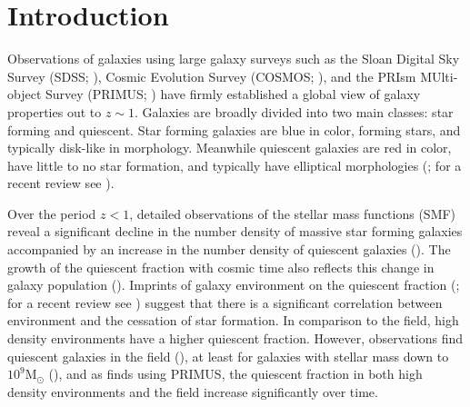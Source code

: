 \documentclass[iop,apj,tighten,twocolappendix,numberedappendix]{emulateapj}
\begin{document}
\section{Introduction}
Observations of galaxies using large galaxy surveys such as the 
Sloan Digital Sky Survey (SDSS; \citealt{York:2000aa}), 
Cosmic Evolution Survey (COSMOS; \citealt{Scoville:2007aa}), 
and the PRIsm MUlti-object Survey (PRIMUS;  \citealt{Coil:2011aa, Cool:2013aa}) 
have firmly established a global view of galaxy properties out to $z \sim 1$. 
Galaxies are broadly divided into two main classes: star forming and quiescent. 
Star forming galaxies are blue in color, forming stars, and typically 
disk-like in morphology. Meanwhile quiescent galaxies are red in color, 
have little to no star formation, and typically have elliptical morphologies 
(\citealt{Kauffmann:2003aa, Blanton:2003aa, Baldry:2006aa, 
Wyder:2007aa, Moustakas:2013aa}; for a recent review see \citealt{Blanton:2009aa}). 


Over the period $z < 1$, detailed observations of the stellar 
mass functions (SMF) reveal a significant decline in the number density 
of massive star forming galaxies accompanied by an increase in the 
number density of quiescent galaxies 
(\citealt{Blanton:2006aa, Borch:2006aa, Bundy:2006aa, Moustakas:2013aa}). 
The growth of the quiescent fraction with cosmic time also reflects 
this change in galaxy population 
(\citealt{Peng:2010aa, Tinker:2013aa, Hahn:2015aa}). 
Imprints of galaxy environment on the quiescent fraction 
(\citealt{Hubble:1936aa, Oemler:1974aa, Dressler:1980aa, Hermit:1996aa}; 
for a recent review see \citealt{Blanton:2009aa}) suggest that there 
is a significant correlation between environment and the 
cessation of star formation. In comparison to the field, high density 
environments have a higher quiescent fraction.
However, observations find quiescent galaxies in the field 
(\citealt{Baldry:2006aa,Tinker:2011aa,Geha:2012aa}), 
at least for galaxies with stellar mass down to 
$10^9\mathrm{M}_\odot$ (\citealt{Geha:2012aa}), and as 
\cite{Hahn:2015aa} finds using PRIMUS, the quiescent fraction in 
both high density environments and the field increase significantly 
over time. 
\end{document}
